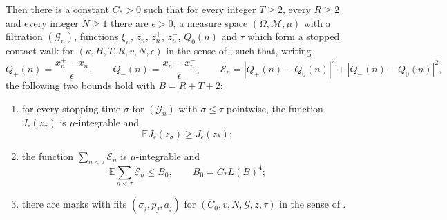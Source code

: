 \begin{lemma}
Then there is a constant $C_*>0$ such that for every integer $T\ge2$, every
$R\ge2$ and every integer $N\ge1$ there are $\epsilon>0$, a measure space
$(\Omega,\mathcal M,\mu)$ with a filtration $(\mathcal G_n)$, functions
$\xi_n$, $z_n$, $z^+_n$, $z^-_n$, $Q_0(n)$ and $\tau$ which form a stopped
contact walk for $(\kappa,H,T,R,v,N,\epsilon)$ in the sense of
, such that, writing
\[
  Q_+(n)=\frac{x^+_n-x_n}{\epsilon},\qquad
  Q_-(n)=\frac{x_n-x^-_n}{\epsilon},\qquad
  \mathcal E_n=|Q_+(n)-Q_0(n)|^2+|Q_-(n)-Q_0(n)|^2,
\]
the following two bounds hold with $B=R+T+2$:
\begin{enumerate}
\item[(i)] for every stopping time $\sigma$ for $(\mathcal G_n)$ with
$\sigma\le\tau$ pointwise, the function $J_\epsilon(z_\sigma)$ is
$\mu$-integrable and
\begin{equation}\label{eq:contact-stopped-expectation}
  \mathbb E J_\epsilon(z_\sigma)\ge J_\epsilon(z_*);
\end{equation}
\item[(ii)] the function $\sum_{n<\tau}\mathcal E_n$ is $\mu$-integrable and
\begin{equation}\label{eq:contact-error-budget}
  \mathbb E\sum_{n<\tau}\mathcal E_n\le B_0,\qquad B_0=C_*L(B)^4 ;
\end{equation}
\item[(iii)] there are marks with fits $(\sigma_j,p_j,a_j)$ for
$(C_0,v,N,\mathcal G,z,\tau)$ in the sense of .
\end{enumerate}
\end{lemma}
